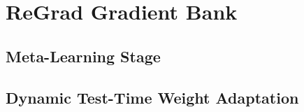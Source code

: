 \section{ReGrad Gradient Bank}
\subsection{Meta-Learning Stage}
\subsection{Dynamic Test-Time Weight Adaptation}
